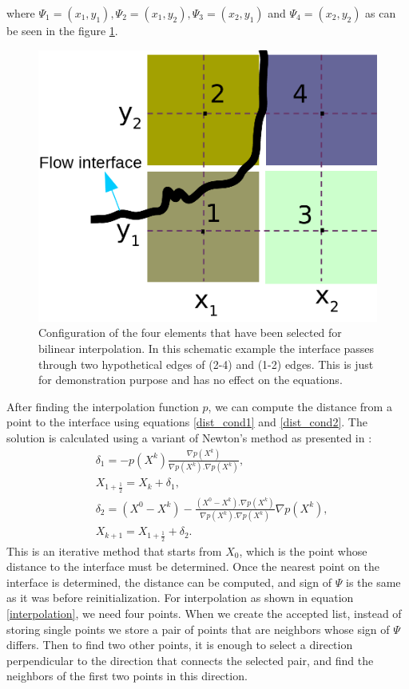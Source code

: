 \documentclass[review]{elsarticle}
\begin{document}
where $\varPsi_1=(x_1,y_1), \varPsi_2=(x_1,y_2), \varPsi_3=(x_2,y_1)$ and $\varPsi_4=(x_2,y_2)$ as can be seen in the figure \ref{fig:bilinear_interp}.
\begin{figure}[ht]
\centering
\includegraphics[scale=.15]{IMAGES/bilinear_interp.png}
\caption{Configuration of the four elements that have been selected for bilinear interpolation. In this schematic example the interface passes through two hypothetical edges of (2-4) and (1-2) edges. This is just for demonstration purpose and has no effect on the equations.}
                \label{fig:bilinear_interp}
\end{figure}
After finding the interpolation function $p$, we can compute the distance from a point to the interface using equations \eqref{dist_cond1} and \eqref{dist_cond2}. 
The solution is calculated using a variant of Newton's method as presented in \cite{Chopp2001}:
\begin{subequations}
\label{eqnewton}
\begin{align}
&\delta_1=-p(X^k)\frac{\nabla p(X^k)}{\nabla p(X^k).\nabla p(X^k)},\\
& X_{1+\frac{1}{2}}=X_k+\delta_1,\\
& \delta_2=(X^0-X^k)-\frac{(X^0-X^k).\nabla p(X^k)}{\nabla p(X^k).\nabla p(X^k)}\nabla p(X^k),\\
&X_{k+1}=X_{1+\frac{1}{2}}+\delta_2.
\end{align}
\end{subequations}
This is an iterative method that starts from $X_0$, which is the point whose distance to the interface must be determined. 
Once the nearest point on the interface is determined, the distance can be computed, and sign of $\varPsi$ is the same as it was before reinitialization.
For interpolation as shown in equation \eqref{interpolation}, we need four points. When we create the accepted list, instead of storing single points we store a pair of points that are 
neighbors whose sign of $\varPsi$ differs. Then to find two other points, it is enough to select a direction perpendicular to the direction that connects the selected pair, 
and find the neighbors of the first two points in this direction. 
\end{document}
